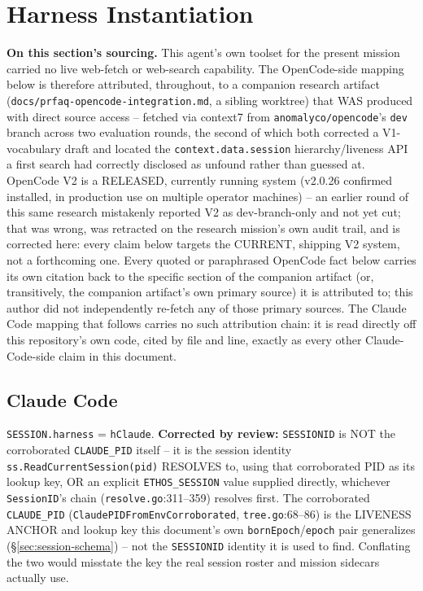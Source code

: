 \documentclass[a4paper,10pt,fleqn]{article}
\newcommand{\fpath}[1]{\texttt{#1}}
\newcommand{\field}[1]{\texttt{#1}}
\begin{document}
\section{Harness Instantiation}
\label{sec:harness-instantiation}

\textbf{On this section's sourcing.} This agent's own toolset for the
present mission carried no live web-fetch or web-search capability.
The OpenCode-side mapping below is therefore attributed, throughout, to
a companion research artifact
(\fpath{docs/prfaq-opencode-integration.md}, a sibling worktree) that
WAS produced with direct source access -- fetched via context7 from
\fpath{anomalyco/opencode}'s \field{dev} branch across two evaluation
rounds, the second of which both corrected a V1-vocabulary draft and
located the \field{context.data.session}
hierarchy/liveness API a first search had correctly disclosed as
unfound rather than guessed at. OpenCode V2 is a RELEASED, currently
running system (v2.0.26 confirmed installed, in production use on
multiple operator machines) -- an earlier round of this same research
mistakenly reported V2 as dev-branch-only and not yet cut; that was
wrong, was retracted on the research mission's own audit trail, and is
corrected here: every claim below targets the CURRENT, shipping V2
system, not a forthcoming one. Every quoted or paraphrased OpenCode
fact below carries its own citation back to the specific section of the
companion artifact (or, transitively, the companion artifact's own
primary source) it is attributed to; this author did not independently
re-fetch any of those primary sources. The Claude Code mapping that
follows carries no such attribution chain: it is read directly off this
repository's own code, cited by file and line, exactly as every other
Claude-Code-side claim in this document.

\subsection{Claude Code}

\fpath{SESSION.harness} = \field{hClaude}. \textbf{Corrected by
review:} \fpath{SESSIONID} is NOT the corroborated \field{CLAUDE\_PID}
itself -- it is the session identity \field{ss.ReadCurrentSession(pid)}
RESOLVES to, using that corroborated PID as its lookup key, OR an
explicit \field{ETHOS\_SESSION} value supplied directly, whichever
\field{SessionID}'s chain (\fpath{resolve.go}:311--359) resolves first.
The corroborated \field{CLAUDE\_PID}
(\field{ClaudePIDFromEnvCorroborated}, \fpath{tree.go}:68--86) is the
LIVENESS ANCHOR and lookup key this document's own
\field{bornEpoch}/\field{epoch} pair generalizes
(\S\ref{sec:session-schema}) -- not the \field{SESSIONID} identity it
is used to find. Conflating the two would misstate the key the real
session roster and mission sidecars actually use.
\end{document}
